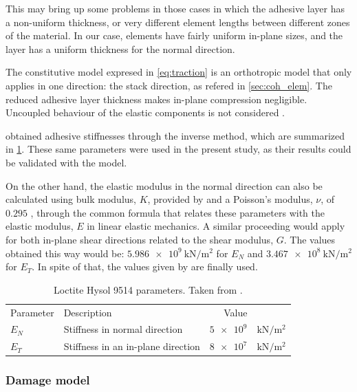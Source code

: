 \documentclass[cmfonts]{witpress}
\begin{document}
This may bring up some problems in those cases in which the adhesive layer has a non-uniform thickness, or very different element lengths between different zones of the material. In our case, elements have fairly uniform in-plane sizes, and the layer has a uniform thickness for the normal direction.

The constitutive model expresed in \cref{eq:traction} is an orthotropic model that only applies in one direction: the stack direction, as refered in \cref{sec:coh_elem}. The reduced adhesive layer thickness makes in-plane compression negligible. Uncoupled behaviour of the elastic components is not considered \cite{Scattina2011}.

\cite{Scattina2011} obtained adhesive stiffnesses through the inverse method, which are summarized in \cref{tab:ads_params}. These same parameters were used in the present study, as their results could be validated with the model.

On the other hand, the elastic modulus in the normal direction can also be calculated using bulk modulus, $K$, provided by \cite{manufCatalog} and a Poisson's modulus, $\nu$, of $\num{0.295}$ \cite{JDiaz}, through the common formula that relates these parameters with the elastic modulus, $E$ in linear elastic mechanics. A similar proceeding would apply for both in-plane shear directions related to the shear modulus, $G$. The values obtained this way would be: $\SI{5.986e9}{\kN/\m^2}$ for $E_{N}$ and $\SI{3.467e8}{\kN/\m^2}$ for $E_{T}$. In spite of that, the values given by \cite{Scattina2011} are finally used.

\begin{table}
	\centering
	\begin{tabular}{llrl}
		Parameter & Description & Value & \\
		
		$E_{N}$ & Stiffness in normal direction & $\num{5e9}$ & $\si{\kN/\m^2}$ \\
		$E_{T}$ & Stiffness in an in-plane direction & $\num{8e7}$ & $\si{\kN/\m^2}$ \\
	\end{tabular}
	\caption[Loctite Hysol 9514 parameters.]{Loctite Hysol 9514 parameters. Taken from \cite{Scattina2011}.}
	\label{tab:ads_params}
\end{table}

\subsubsection{Damage model}
\label{sec:damage}
\end{document}
